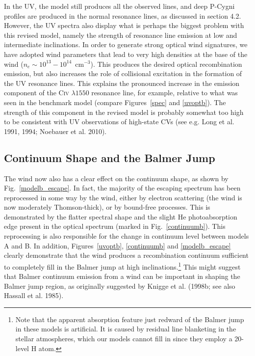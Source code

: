 In the UV, the model still produces all the observed lines, 
and deep P-Cygni profiles are produced in the normal resonance lines,
as discussed in section 4.2. However, the UV spectra also
display what is perhaps the biggest problem with this revised model,
namely the strength of resonance line emission 
at low and intermediate inclinations.
In order to generate strong optical wind signatures, we have adopted wind
parameters that lead to very high densities at the base of the wind
($n_e\sim10^{13}-10^{14}$~cm$^{-3}$). This produces
the desired optical recombination emission, but also increases the
role of collisional excitation in the formation of the UV resonance
lines. This explains the pronounced increase in the emission component 
of the C\textsc{iv} $\lambda1550$ resonance line, for example, relative to
what was seen in the benchmark model (compare Figures~\ref{spec} and
\ref{uvoptb}). The strength of this component in the revised model 
is probably somewhat too high to be consistent with UV observations 
of high-state CVs (see e.g. Long et al. 1991, 1994; Noebauer et al. 2010).
\nocite{long1991,long1994, noebauer}


\subsection{Continuum Shape and the Balmer Jump}

The wind now also has a clear effect on the continuum shape,
as shown by Fig.~\ref{modelb_escape}. In fact, the majority of the
escaping spectrum has been reprocessed in some way by the wind,
either by electron scattering (the wind is now moderately Thomson-thick),
or by bound-free processes. This is demonstrated by the flatter spectral shape
and the slight He photoabsorption edge present in the optical spectrum 
(marked in Fig.~\ref{continuumb}). This reprocessing is also
responsible for the change in continuum level between models A and B.
In addition, Figures~\ref{uvoptb}, \ref{continuumb} 
and \ref{modelb_escape} clearly demonstrate that the wind produces
a recombination continuum sufficient to completely fill in the Balmer jump
at high inclinations.\footnote{Note that the apparent absorption feature 
just redward of the Balmer jump in these models is artificial. It is
caused by residual line blanketing in the stellar atmospheres, which
our models cannot fill in since they employ a 20-level H atom.}
This might suggest that Balmer continuum emission from a wind can be important 
in shaping the Balmer jump region, as
originally suggested by Knigge et al.
(1998b; see also Hassall et al. 1985)\nocite{KLWB98,hassall}. 

